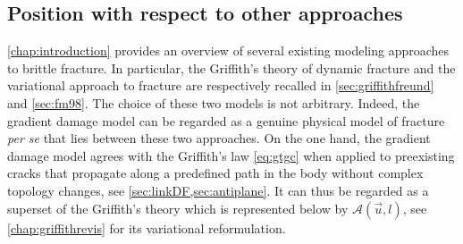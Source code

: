 \subsection{Position with respect to other approaches}
\cref{chap:introduction} provides an overview of several existing modeling approaches to brittle fracture. In particular, the Griffith's theory of dynamic fracture and the variational approach to fracture are respectively recalled in \cref{sec:griffithfreund} and \cref{sec:fm98}. The choice of these two models is not arbitrary. Indeed, the gradient damage model can be regarded as a genuine physical model of fracture \emph{per se} that lies between these two approaches. On the one hand, the gradient damage model agrees with the Griffith's law \eqref{eq:gtgc} when applied to preexisting cracks that propagate along a predefined path in the body without complex topology changes, see \cref{sec:linkDF,sec:antiplane}. It can thus be regarded as a superset of the Griffith's theory which is represented below by $\mathcal{A}(\vec{u},l)$, see \cref{chap:griffithrevis} for its variational reformulation.

